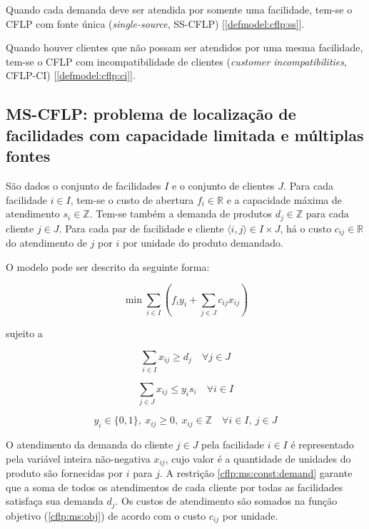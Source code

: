 \documentclass[]{article}
\begin{document}
		Quando cada demanda deve ser atendida por somente uma facilidade, tem-se o CFLP com fonte única (\textit{single-source}, SS-CFLP) [\ref{defmodel:cflp:ss}]. 
		
		Quando houver clientes que não possam ser atendidos por uma mesma facilidade, tem-se o CFLP com incompatibilidade de clientes (\textit{customer incompatibilities}, CFLP-CI) [\ref{defmodel:cflp:ci}].
		 
		\subsection{MS-CFLP: problema de localização de facilidades com capacidade limitada e múltiplas fontes} \label{defmodel:cflp:ms}
		
			São dados o conjunto de facilidades $I$ e o conjunto de clientes $J$.
			Para cada facilidade $i \in I$, tem-se o custo de abertura $f_i \in \mathbb{R}$ e a capacidade máxima de atendimento $s_i \in \mathbb{Z}$. 
			Tem-se também a demanda de produtos $d_j \in \mathbb{Z}$ para cada cliente $j \in J$.
			Para cada par de facilidade e cliente $\langle i, j \rangle \in I \times J$, há o custo $c_{ij} \in \mathbb{R}$ do atendimento de $j$ por $i$ por unidade do produto demandado.  
			
			O modelo pode ser descrito da seguinte forma:
		
			\begin{equation}
				\label{cflp:ms:obj}		
				\min \sum_{i \in I} 
				(
				f_i y_i + \sum_{j \in J} c_{ij} x_{ij}
				)
			\end{equation}
		
			sujeito a 				
			
			\begin{equation}
				\label{cflp:ms:const:demand}		
				\sum_{i \in I} x_{ij} \ge d_j %
				\quad
				\forall j \in J
			\end{equation}
		
			\begin{equation}
				\label{cflp:ms:const:capacity}		
				\sum_{j \in J} x_{ij} \le y_i s_i 
				\quad
				\forall i \in I
			\end{equation}
			
			\begin{equation}
				\label{cflp:ms:dom:var}		
				y_i \in \{0, 1\}, 
				\ x_{ij} \ge 0, 
				\ x_{ij} \in \mathbb{Z}
				\quad
				\forall i \in I, \ j \in J
			\end{equation}
		
			O atendimento da demanda do cliente $j \in J$ pela facilidade $i \in I$ é representado pela variável inteira não-negativa $x_{ij}$, cujo valor é a quantidade de unidades do produto são fornecidas por $i$ para $j$.
			A restrição \ref{cflp:ms:const:demand} garante que a soma de todos os atendimentos de cada cliente por todas as facilidades satisfaça sua demanda $d_j$.
			Os custos de atendimento são somados na função objetivo (\ref{cflp:ms:obj}) de acordo com o custo $c_{ij}$ por unidade. 		
			
\end{document}
